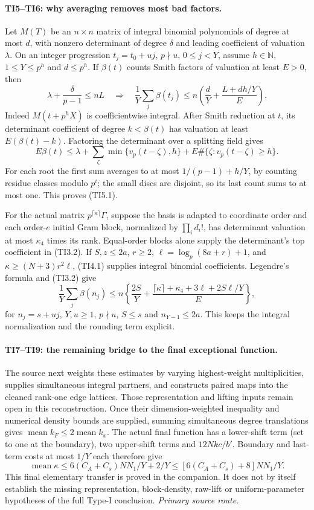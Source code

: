 \documentclass[11pt,a4paper]{article}
\numberwithin{equation}{section}
\theoremstyle{remark}\newtheorem{remark}[theorem]{Remark}
\begin{document}
\paragraph{TI5--TI6: why averaging removes most bad factors.}
Let $M(T)$ be an $n\times n$ matrix of integral binomial polynomials of
degree at most $d$, with nonzero determinant of degree $\delta$ and
leading coefficient of valuation $\lambda$.
On an integer progression $t_j=t_0+uj$, $p\nmid u$, $0\leq j<Y$, assume
$h\in\mathbb N$, $1\leq Y\leq p^h$ and $d\leq p^h$.
If $\beta(t)$ counts Smith factors of valuation at
least $E>0$, then
\[
 \lambda+\frac\delta{p-1}\leq nL
 \quad\Longrightarrow\quad
 \frac1Y\sum_j\beta(t_j)
 \leq n\left(\frac dY+\frac{L+dh/Y}{E}\right).
 \tag{TI5.1}
\]
Indeed $M(t+p^hX)$ is coefficientwise integral.  After Smith reduction at
$t$, its determinant coefficient of degree $k<\beta(t)$ has valuation
at least $E(\beta(t)-k)$.
Factoring the determinant over a splitting field gives
\[
 E\beta(t)\leq\lambda+\sum_\zeta\min\{v_p(t-\zeta),h\}
       +E\#\{\zeta:v_p(t-\zeta)\geq h\}.
\]
For each root the first sum averages to at most $1/(p-1)+h/Y$,
by counting residue classes modulo $p^i$; the small discs are disjoint,
so its last count sums to at most one. This proves (TI5.1).

For the actual matrix $p^{\lceil\kappa\rceil}\Gamma$, suppose the basis is
adapted to coordinate order and each order-$e$ initial Gram block, normalized
by $\prod_i d_i!$, has determinant valuation at most $\kappa_4$ times its rank.
Equal-order blocks alone supply the determinant's top coefficient in (TI3.2).
If $S,z\leq2a$, $r\geq2$, $\ell=\log_p(8a+r)+1$, and
$\kappa\geq(N+3)r^2\ell$, (TI4.1) supplies integral binomial coefficients.
Legendre's formula and (TI3.2) give
\[
 \frac1Y\sum_j\beta(n_j)
 \leq n\left\{\frac{2S}Y+
 \frac{\lceil\kappa\rceil+\kappa_4+3\ell+2S\ell/Y}{E}\right\},
 \tag{TI6.1}
\]
for $n_j=s+uj$, $Y,u\geq1$, $p\nmid u$, $S\leq s$ and $n_{Y-1}\leq2a$.
This keeps the integral normalization and the rounding term explicit.

\paragraph{TI7--TI9: the remaining bridge to the final exceptional function.}
The source next weights these estimates by varying highest-weight
multiplicities, supplies simultaneous integral partners, and constructs
paired maps into the cleaned rank-one edge lattices.
Those representation and lifting inputs remain open in this reconstruction.
Once their dimension-weighted inequality and numerical density bounds are
supplied, summing simultaneous degree translations gives
$\operatorname{mean}k_F\leq2\operatorname{mean}k_x$.
The actual final function has a lower-shift term (set to one at the boundary),
two upper-shift terms and $12Nkc/b'$.  Boundary and last-term costs at most
$1/Y$ each therefore give
\[
 \operatorname{mean}\kappa
 \leq6(C_A+C_s)NN_1/Y+2/Y
 \leq[6(C_A+C_s)+8]NN_1/Y.
 \tag{TI8.1}
\]
This final elementary transfer is proved in the companion.
It does not by itself establish the missing representation, block-density,
raw-lift or uniform-parameter hypotheses of the full Type-I conclusion.
\noindent\textit{Primary source route.}\cite{type-one-actual}
\end{document}
